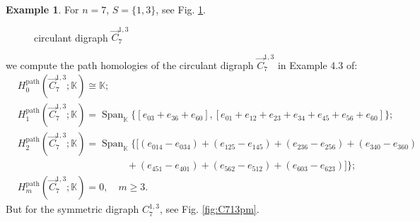 \documentclass[11pt]{amsart}
\DeclareMathOperator{\Span}{Span}
\newcommand{\K}{\mathbb K}
\theoremstyle{plain}
\theoremstyle{definition}
\newtheorem{example}[theorem]{Example}
\numberwithin{equation}{section}
\begin{document}
\smallskip
\begin{example}

For $n=7$, $S=\{1,3\}$, see Fig. \ref{fig:C713}.
\begin{figure}[htbp]
\centering
{}
\caption{circulant digraph $\vec{C}_7^{1,3}$}
\label{fig:C713}
\end{figure}


we compute the path homologies of the circulant digraph $\vec{C}_7^{1,3}$ in Example 4.3 of\cite{TY2}: 
\begin{align*}
&H_0^{\mathrm{path}}(\vec{C}_7^{1,3};\K)\cong\K;\\
&H_1^{\mathrm{path}}(\vec{C}_7^{1,3};\K)=\Span_{\K}\bigg\{[e_{03}+e_{36}+e_{60}],[e_{01}+e_{12}+e_{23}+e_{34}+e_{45}+e_{56}+e_{60}]\bigg\};\\
&H_2^{\mathrm{path}}(\vec{C}_7^{1,3};\K)=\Span_{\K}\bigg\{[(e_{014}-e_{034})+(e_{125}-e_{145})+(e_{236}-e_{256})+(e_{340}-e_{360})\\
&\qquad\qquad\qquad\qquad\qquad\quad+(e_{451}-e_{401})+(e_{562}-e_{512})+(e_{603}-e_{623})]\bigg\};\\
&H_m^{\mathrm{path}}(\vec{C}_7^{1,3};\K)=0,\quad m\geq 3.
\end{align*}
But for the symmetric digraph $C_7^{1,3}$, see Fig. \ref{fig:C713pm}. 
\begin{figure}[h]
\centering
{}
\end{figure}
\end{example}
\end{document}
